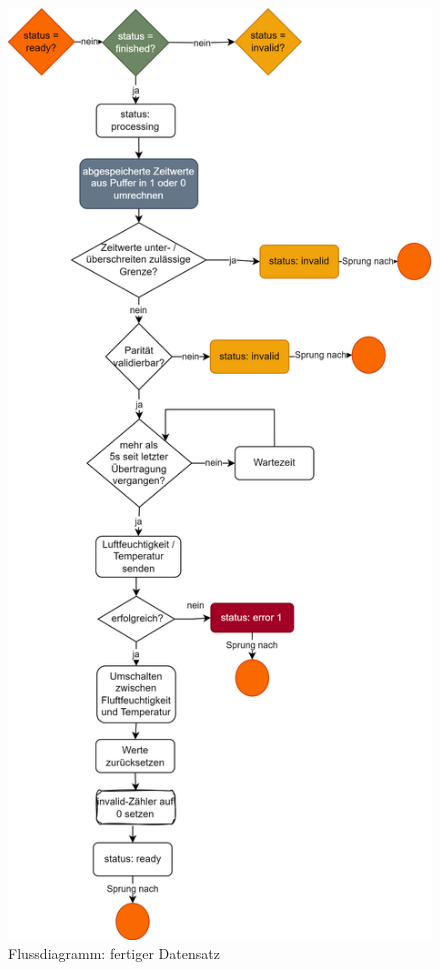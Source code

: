 \documentclass[11pt,a4paper,titlepage]{article}
\begin{document}
\begin{figure}[H]
    \centering
    \includegraphics[height=0.9\textheight]{./Bilder-Tobit/flussdiagramm_finished.png}
    \caption{Flussdiagramm: fertiger Datensatz}
    \label{fig:flussdiagramm_finished}
\end{figure}
\end{document}

